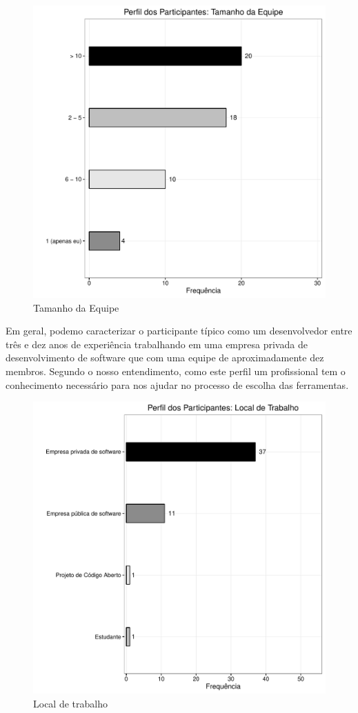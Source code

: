 \begin{figure}[htpb]
	\centering
	\includegraphics[width=0.8\linewidth]{./chapter-estudo-funcionalidades-fgrm/img/grafico_escolha_ferramentas_tamanho_equipe.pdf}
	\caption{Tamanho da Equipe}
	\label{fig:grafico_escolha_ferramentas_tamanho_equipe}
\end{figure}

Em geral, podemo caracterizar o participante típico como um desenvolvedor entre
três e dez anos de experiência trabalhando em uma empresa privada de
desenvolvimento de software que com uma equipe de aproximadamente dez membros.
Segundo o nosso entendimento, como este perfil um profissional tem o
conhecimento necessário para nos ajudar no processo de escolha das ferramentas.

\begin{figure}[htpb]
	\centering
	\includegraphics[width=0.8\linewidth]{./chapter-estudo-funcionalidades-fgrm/img/grafico_escolha_ferramentas_local_trabalho.pdf}
	\caption{Local de trabalho}
	\label{fig:grafico_escolha_ferramentas_local_trabalho}
\end{figure}

